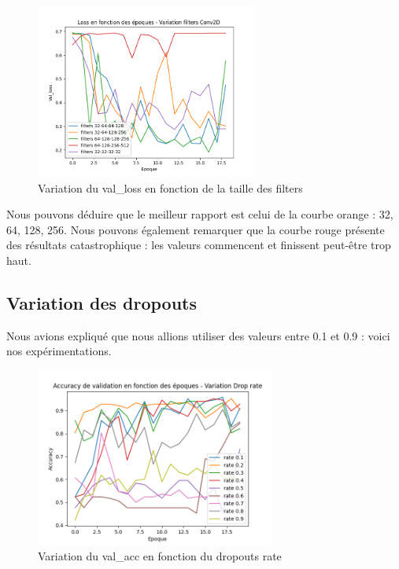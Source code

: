\documentclass{rapport}
\begin{document}
        \begin{figure}[H]
            \centering
            \includegraphics[width=0.65\textwidth]{rapport/plots/filters_loss.png}
            \caption{Variation du val\_loss en fonction de la taille des filters}
            \label{fig:mesh2}
        \end{figure}
        
        Nous pouvons déduire que le meilleur rapport est celui de la courbe orange : 32, 64, 128, 256. Nous pouvons également remarquer que la courbe rouge présente des résultats catastrophique : les valeurs commencent et finissent peut-être trop haut.
        
        \subsection{Variation des dropouts}
        Nous avions expliqué que nous allions utiliser des valeurs entre 0.1 et 0.9 : voici nos expérimentations.
        
        \begin{figure}[H]
            \centering
            \includegraphics[width=0.7\textwidth]{rapport/plots/dropoutr_acc.png}
            \caption{Variation du val\_acc en fonction du dropouts rate}
            \label{fig:mesh1}
        \end{figure}
\end{document}
